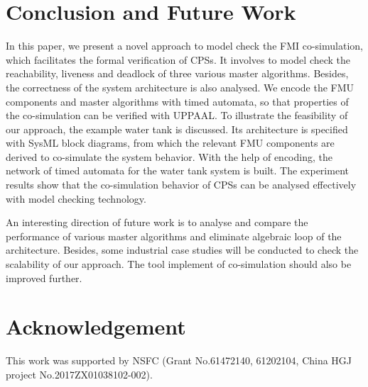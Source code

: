 \section{Conclusion and Future Work}
\label{sec:conclusion&ack}
In this paper, we present a novel approach to model check the FMI co-simulation, which facilitates the formal verification of CPSs. It involves to model check the reachability, liveness and deadlock of three various master algorithms. Besides, the correctness of the system architecture is also analysed. We encode the FMU components and master algorithms with timed automata, so that properties of the co-simulation can be verified with UPPAAL. To illustrate the feasibility of our approach, the example water tank is discussed. Its architecture is specified with SysML block diagrams, from which the relevant FMU components are derived to co-simulate the system behavior. With the help of encoding, the network of timed automata for the water tank system is built. The experiment results show that the co-simulation behavior of CPSs can be analysed effectively with model checking technology.

An interesting direction of future work is to analyse and compare the performance of various master algorithms and eliminate algebraic loop of the architecture. Besides, some industrial case studies will be conducted to check the scalability of our approach. The tool implement of co-simulation should also be improved further.
\section*{Acknowledgement}
This work was supported by NSFC (Grant No.61472140, 61202104, China HGJ project No.2017ZX01038102-002). 



